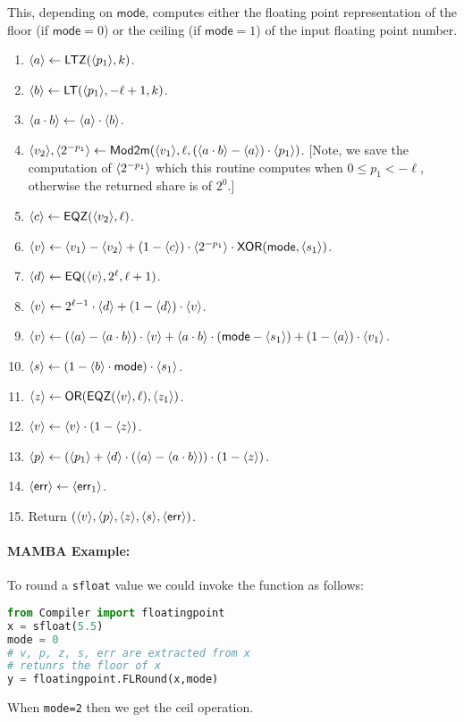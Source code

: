 This, depending on $\mathsf{mode}$, computes either the floating point
representation of the floor (if $\mathsf{mode}=0$) or the ceiling (if $\mathsf{mode}=1$)
of the input floating point number.
\begin{enumerate}
\item $\langle a \rangle \leftarrow \mathsf{LTZ}(\langle p_1 \rangle,k)$.
\item $\langle b \rangle \leftarrow \mathsf{LT}(\langle p_1 \rangle,-\ell+1,k)$.
\item $\langle a \cdot b \rangle \leftarrow \langle a \rangle \cdot \langle b \rangle$.
\item $\langle v_2 \rangle,\langle 2^{-p_1} \rangle \leftarrow \mathsf{Mod2m}(\langle v_1 \rangle,\ell,(\langle a \cdot b \rangle-\langle a \rangle) \cdot \langle p_1 \rangle)$. 
	[Note, we save the computation of $\langle 2^{-p_1} \rangle$ which this routine computes when $0 \le p_1 < -\ell$, otherwise the returned share is of $2^0$.]
\item $\langle c \rangle \leftarrow \mathsf{EQZ}(\langle v_2 \rangle,\ell)$.
\item $\langle v \rangle \leftarrow \langle v_1 \rangle-\langle v_2 \rangle+(1-\langle c \rangle) \cdot \langle 2^{-p_1} \rangle 
	\cdot \mathsf{XOR}(\mathsf{mode},\langle s_1 \rangle)$.
\item $\langle d \rangle \leftarrow \mathsf{EQ}(\langle v \rangle,2^\ell,\ell+1)$.
\item $\langle v \rangle \leftarrow 2^{\ell-1} \cdot \langle d \rangle + (1-\langle d \rangle) \cdot \langle v \rangle$.
\item $\langle v \rangle \leftarrow (\langle a \rangle-\langle a \cdot b \rangle) \cdot \langle v \rangle
			+ \langle a \cdot b \rangle \cdot (\mathsf{mode}-\langle s_1 \rangle)
					+ (1-\langle a \rangle) \cdot \langle v_1 \rangle$.
\item $\langle s \rangle \leftarrow (1-\langle b \rangle \cdot \mathsf{mode}) \cdot \langle s_1 \rangle$.
\item $\langle z \rangle \leftarrow \mathsf{OR}(\mathsf{EQZ}(\langle v \rangle,\ell),\langle z_1 \rangle)$.
\item $\langle v \rangle \leftarrow \langle v \rangle \cdot (1-\langle z \rangle)$.
\item $\langle p \rangle \leftarrow (\langle p_1 \rangle+\langle d \rangle \cdot (\langle a \rangle-\langle a \cdot b \rangle)) \cdot (1-\langle z \rangle)$.
\item $\langle \mathsf{err} \rangle \leftarrow \langle \mathsf{err}_1 \rangle$.
\item Return $(\langle v \rangle,\langle p \rangle,\langle z \rangle,\langle s \rangle,\langle \mathsf{err} \rangle)$.
\end{enumerate}

\paragraph{MAMBA Example:} To round a \verb|sfloat| value we could invoke the function as follows: 
\begin{lstlisting}[language={python}]
from Compiler import floatingpoint
x = sfloat(5.5)
mode = 0 
# v, p, z, s, err are extracted from x
# retunrs the floor of x
y = floatingpoint.FLRound(x,mode)
\end{lstlisting}
When \verb+mode=2+ then we get the ceil operation.


